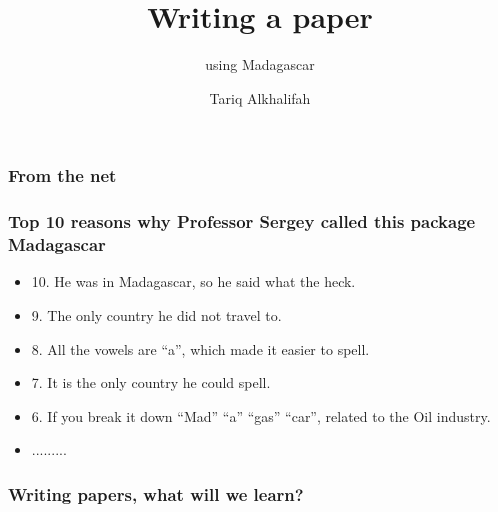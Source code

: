 


\title[]{Writing a paper}
\subtitle{using Madagascar}
\author{Tariq Alkhalifah} 
\date{}
 { \cwpcover }

\def\beq{\begin{equation}}
\def\eeq{\end{equation}}
\def\beqa{\begin{eqnarray}}
\def\eeqa{\end{eqnarray}}


\begin{frame} 
\frametitle{From the net}


\end{frame}
\cwpnote{}

\begin{frame} 

\frametitle{Top 10 reasons why Professor Sergey called this package Madagascar}

\begin{itemize}
\item 10. He was in Madagascar, so he said what the heck.
\item 9. The only country he did not travel to.
\item 8. All the vowels are ``a'', which made it easier to spell.
\item 7. It is the only country he could spell.
\item 6. If you break it down ``Mad'' ``a'' ``gas'' ``car'', related
  to the Oil industry.
\item .........
\end{itemize}

\end{frame}
\cwpnote{}

\begin{frame} 

\frametitle{Writing papers, what will we learn?}


\end{frame}
\cwpnote{}

